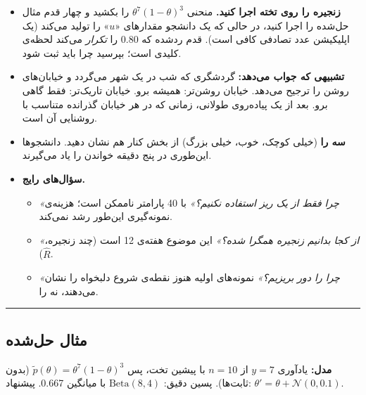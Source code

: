 \begin{itemize}
\tightlist
\item
  \textbf{زنجیره را روی تخته اجرا کنید.} منحنی \(\theta^7(1-\theta)^3\)
  را بکشید و چهار قدم مثال حل‌شده را اجرا کنید، در حالی که یک دانشجو
  مقدارهای «\(u\)» را تولید می‌کند (یک اپلیکیشن عدد تصادفی کافی است). قدم
  رد‌شده که 0.80 را \emph{تکرار} می‌کند لحظه‌ی کلیدی است؛ بپرسید چرا باید
  ثبت شود.
\item
  \textbf{تشبیهی که جواب می‌دهد:} گردشگری که شب در یک شهر می‌گردد و
  خیابان‌های روشن را ترجیح می‌دهد. خیابان روشن‌تر: همیشه برو. خیابان
  تاریک‌تر: فقط گاهی برو. بعد از یک پیاده‌روی طولانی، زمانی که در هر
  خیابان گذرانده متناسب با روشنایی آن است.
\item
  \textbf{سه  را} (خیلی کوچک، خوب، خیلی بزرگ) از بخش
   کنار هم نشان دهید. دانشجوها این‌طوری در پنج دقیقه خواندن
   را یاد می‌گیرند.
\item
  \textbf{سؤال‌های رایج.}

  \begin{itemize}
  \tightlist
  \item
    \emph{«چرا فقط از یک  ریز استفاده نکنیم؟»} با 40 پارامتر
     ناممکن است؛ هزینه‌ی نمونه‌گیری این‌طور رشد نمی‌کند.
  \item
    \emph{«از کجا بدانیم زنجیره همگرا شده؟»} این موضوع هفته‌ی 12 است (چند
    زنجیره، \(\hat R\)).
  \item
    \emph{«چرا  را دور بریزیم؟»} نمونه‌های اولیه هنوز نقطه‌ی
    شروع دلبخواه را نشان می‌دهند، نه  را.
  \end{itemize}
\end{itemize}

\begin{center}\rule{0.5\linewidth}{0.5pt}\end{center}

\subsection{مثال حل‌شده}

\textbf{مدل:} یادآوری \(y = 7\) از \(n = 10\) با پیشین تخت، پس
\(\tilde p(\theta) = \theta^7(1-\theta)^3\) (بدون ثابت‌ها). پسین دقیق:
\(\mathrm{Beta}(8, 4)\) با میانگین 0.667. پیشنهاد:
\(\theta' = \theta + \mathcal{N}(0,\allowbreak 0.1)\).

